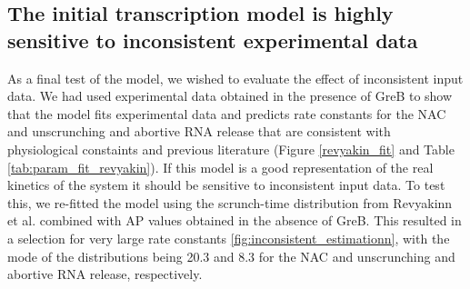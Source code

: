 \subsection{The initial transcription model is highly sensitive to
inconsistent experimental data}
As a final test of the model, we wished to evaluate the effect of
inconsistent input data. We had used experimental data obtained in the
presence of GreB to show that the model fits experimental data and predicts
rate constants for the NAC and unscrunching and abortive RNA release that are
consistent with physiological constaints and previous literature (Figure
\ref{revyakin_fit} and Table \ref{tab:param_fit_revyakin}). If this model is a
good representation of the real kinetics of the system it should be sensitive
to inconsistent input data. To test this, we re-fitted the model using the
scrunch-time distribution from Revyakinn et al. combined with AP values
obtained in the absence of GreB. This resulted in a selection for very large
rate constants \ref{fig:inconsistent_estimationn}, with the mode of the
distributions being 20.3 and 8.3 for the NAC and unscrunching and abortive RNA
release, respectively.
  

